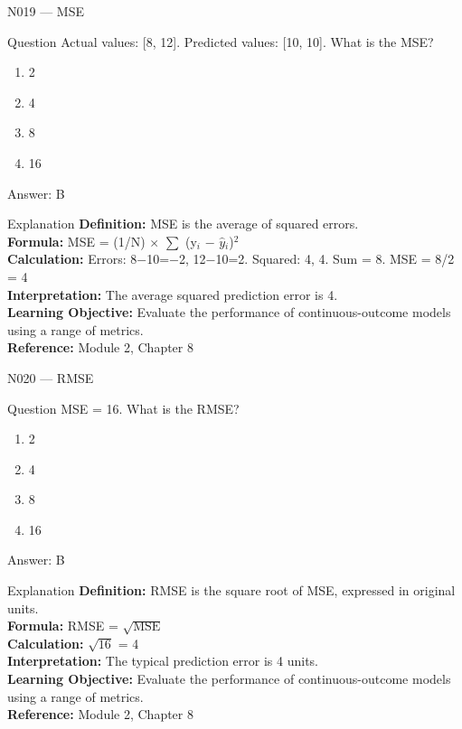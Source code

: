 \documentclass[aspectratio=169,8pt]{beamer}
\begin{document}
	\begin{frame}{N019 --- MSE}
		\begin{block}{Question}
			Actual values: [8, 12]. Predicted values: [10, 10]. What is the MSE?
			\begin{enumerate}
				\item 2
				\item 4
				\item 8
				\item 16
			\end{enumerate}
		\end{block}
		\begin{exampleblock}{Answer: B}\end{exampleblock}
		\begin{block}{Explanation}
			\textbf{Definition:} MSE is the average of squared errors.\\
			\textbf{Formula:} MSE = (1/N) $\times$ $\sum$ (y$_{i}$ $-$ $\hat{y}$$_{i}$)$^{2}$\\
			\textbf{Calculation:} Errors: 8$-$10=$-$2, 12$-$10=2. Squared: 4, 4. Sum = 8. MSE = 8/2 = 4\\
			\textbf{Interpretation:} The average squared prediction error is 4.\\
			\textbf{Learning Objective:} Evaluate the performance of continuous-outcome models using a range of metrics.\\
			\textbf{Reference:} Module 2, Chapter 8
		\end{block}
	\end{frame}
	
	\begin{frame}{N020 --- RMSE}
		\begin{block}{Question}
			MSE = 16. What is the RMSE?
			\begin{enumerate}
				\item 2
				\item 4
				\item 8
				\item 16
			\end{enumerate}
		\end{block}
		\begin{exampleblock}{Answer: B}\end{exampleblock}
		\begin{block}{Explanation}
			\textbf{Definition:} RMSE is the square root of MSE, expressed in original units.\\
			\textbf{Formula:} RMSE = $\sqrt{\text{MSE}}$\\
			\textbf{Calculation:} $\sqrt{16}$ = 4\\
			\textbf{Interpretation:} The typical prediction error is 4 units.\\
			\textbf{Learning Objective:} Evaluate the performance of continuous-outcome models using a range of metrics.\\
			\textbf{Reference:} Module 2, Chapter 8
		\end{block}
	\end{frame}
	
\end{document}
